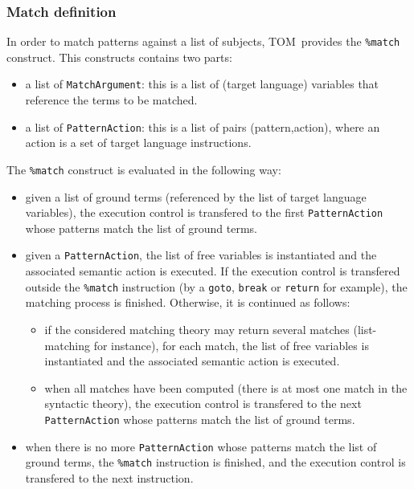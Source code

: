 \documentclass[a4paper]{article}
\newcommand{\TOM}{\textsf{TOM}}
\begin{document}
\subsubsection{Match definition}

In order to match patterns against a list of subjects, \TOM\ provides
the \texttt{\%match} construct.
This constructs contains two parts:
\begin{itemize}
\item a list of \texttt{MatchArgument}: this is a list of (target
  language) variables that reference the terms to be matched.
\item a list of \texttt{PatternAction}: this is a list of pairs
  (pattern,action), where an action is a set of target language
  instructions.  
\end{itemize}

The \texttt{\%match} construct is evaluated in the following way:
\begin{itemize}
\item given a list of ground terms (referenced by the list of target
  language variables), the execution control is transfered to the
  first \texttt{PatternAction} whose patterns match the list of ground
  terms.
\item given a \texttt{PatternAction}, the list of free variables is
  instantiated and the associated semantic action is executed.
  If the execution control is transfered outside the
  \texttt{\%match} instruction (by a \texttt{goto}, \texttt{break} or
  \texttt{return} for example), the matching process is finished.
  Otherwise, it is continued as follows:
  \begin{itemize}
  \item if the considered matching theory may return several matches
    (list-matching for instance), for each match, the list of free
    variables is instantiated and the associated semantic action is
    executed.
  \item when all matches have been computed (there is at most one match
    in the syntactic theory), the execution control is transfered to
    the next \texttt{PatternAction} whose patterns match the list of
    ground terms. 
  \end{itemize}

\item when there is no more \texttt{PatternAction} whose patterns
  match the list of ground terms, the \texttt{\%match} instruction is
  finished, and the execution control is transfered to the next
  instruction. 
\end{itemize}
\end{document}
